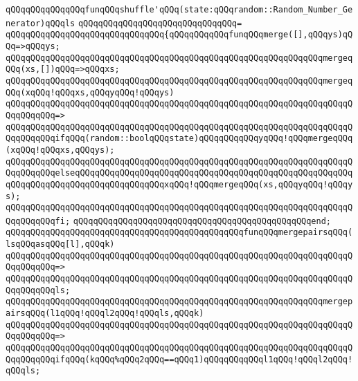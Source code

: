 \newline
\newline
\verb|qQQqqQQqqQQqqQQqfunqQQqshuffle'qQQq(state:qQQqrandom::Random_Number_Generator)qQQqls|\newline
\verb|qQQqqQQqqQQqqQQqqQQqqQQqqQQqqQQq=|\newline
\verb|qQQqqQQqqQQqqQQqqQQqqQQqqQQqqQQq{qQQqqQQqqQQqfunqQQqmerge([],qQQqys)qQQq=>qQQqys;|\newline
\verb|qQQqqQQqqQQqqQQqqQQqqQQqqQQqqQQqqQQqqQQqqQQqqQQqqQQqqQQqqQQqqQQqmergeqQQq(xs,[])qQQq=>qQQqxs;|\newline
\newline
\verb|qQQqqQQqqQQqqQQqqQQqqQQqqQQqqQQqqQQqqQQqqQQqqQQqqQQqqQQqqQQqqQQqmergeqQQq(xqQQq!qQQqxs,qQQqyqQQq!qQQqys)|\newline
\verb|qQQqqQQqqQQqqQQqqQQqqQQqqQQqqQQqqQQqqQQqqQQqqQQqqQQqqQQqqQQqqQQqqQQqqQQqqQQqqQQq=>|\newline
\verb|qQQqqQQqqQQqqQQqqQQqqQQqqQQqqQQqqQQqqQQqqQQqqQQqqQQqqQQqqQQqqQQqqQQqqQQqqQQqqQQqifqQQq(random::boolqQQqstate)qQQqqQQqqQQqyqQQq!qQQqmergeqQQq(xqQQq!qQQqxs,qQQqys);|\newline
\verb|qQQqqQQqqQQqqQQqqQQqqQQqqQQqqQQqqQQqqQQqqQQqqQQqqQQqqQQqqQQqqQQqqQQqqQQqqQQqqQQqelseqQQqqQQqqQQqqQQqqQQqqQQqqQQqqQQqqQQqqQQqqQQqqQQqqQQqqQQqqQQqqQQqqQQqqQQqqQQqqQQqqQQqqQQqxqQQq!qQQqmergeqQQq(xs,qQQqyqQQq!qQQqys);|\newline
\verb|qQQqqQQqqQQqqQQqqQQqqQQqqQQqqQQqqQQqqQQqqQQqqQQqqQQqqQQqqQQqqQQqqQQqqQQqqQQqqQQqfi;|\newline
\verb|qQQqqQQqqQQqqQQqqQQqqQQqqQQqqQQqqQQqqQQqqQQqqQQqend;|\newline
\newline
\verb|qQQqqQQqqQQqqQQqqQQqqQQqqQQqqQQqqQQqqQQqqQQqqQQqfunqQQqmergepairsqQQq(lsqQQqasqQQq[l],qQQqk)|\newline
\verb|qQQqqQQqqQQqqQQqqQQqqQQqqQQqqQQqqQQqqQQqqQQqqQQqqQQqqQQqqQQqqQQqqQQqqQQqqQQqqQQq=>|\newline
\verb|qQQqqQQqqQQqqQQqqQQqqQQqqQQqqQQqqQQqqQQqqQQqqQQqqQQqqQQqqQQqqQQqqQQqqQQqqQQqqQQqls;|\newline
\newline
\verb|qQQqqQQqqQQqqQQqqQQqqQQqqQQqqQQqqQQqqQQqqQQqqQQqqQQqqQQqqQQqqQQqmergepairsqQQq(l1qQQq!qQQql2qQQq!qQQqls,qQQqk)|\newline
\verb|qQQqqQQqqQQqqQQqqQQqqQQqqQQqqQQqqQQqqQQqqQQqqQQqqQQqqQQqqQQqqQQqqQQqqQQqqQQqqQQq=>|\newline
\verb|qQQqqQQqqQQqqQQqqQQqqQQqqQQqqQQqqQQqqQQqqQQqqQQqqQQqqQQqqQQqqQQqqQQqqQQqqQQqqQQqifqQQq(kqQQq%qQQq2qQQq==qQQq1)qQQqqQQqqQQql1qQQq!qQQql2qQQq!qQQqls;|\newline
